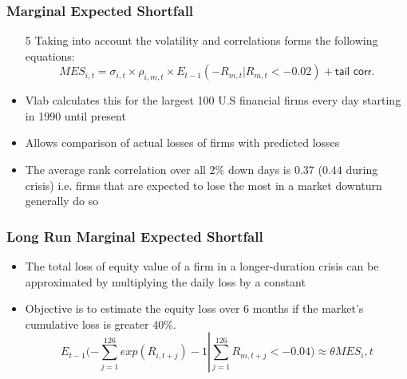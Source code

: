 \documentclass[11pt]{beamer}
\begin{document}

\begin{frame}
\frametitle{Marginal Expected Shortfall}
\begin{enumerate}\itemsep10pt
	\item[5] Taking into account the volatility and correlations forms the following equations:
    \begin{equation*}
    MES_{i,t} = \sigma_{i,t} \times \rho_{i,m,t} \times E_{t-1} (-R_{m,t} | R_{m,t} < -0.02) + \textsf{tail corr.}
    \end{equation*}
\end{enumerate}
\begin{itemize}
  \item Vlab calculates this for the largest 100 U.S financial firms every day starting in 1990 until present
  \item Allows comparison of actual losses of firms with predicted losses
  \item The average rank correlation over all $2\%$ down days is $0.37$ ($0.44$ during crisis) i.e. firms that are expected to lose the most in a market downturn generally do so
  \end{itemize}
\end{frame}


\begin{frame}
\frametitle{Long Run Marginal Expected Shortfall}
\begin{itemize}\itemsep10pt
\item The total loss of equity value of a firm in a longer-duration crisis can be approximated by multiplying the daily loss by a constant
\item Objective is to estimate the equity loss over 6 months if the market's cumulative loss is greater 40\%.
\begin{equation*}
E_{t-1} (-\sum_{j=1}^{126}exp(R_{i,t+j})-1 \left| \sum_{j=1}^{126}R_{m,t+j} < -0.04) \approx \theta MES_i,t \right.
\end{equation*}
\end{itemize}
\end{frame}

\end{document}
